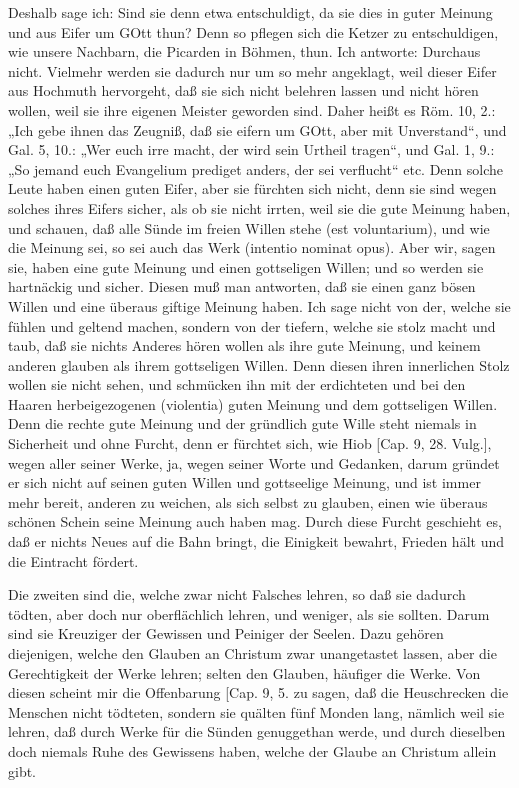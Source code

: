 Deshalb sage ich: Sind sie denn etwa entschuldigt, da sie dies in guter Meinung und aus Eifer um GOtt thun? Denn so pflegen sich die Ketzer zu entschuldigen, wie unsere Nachbarn, die Picarden in Böhmen, thun. Ich antworte: Durchaus nicht. Vielmehr werden sie dadurch nur um so mehr angeklagt, weil dieser Eifer aus Hochmuth hervorgeht, daß sie sich nicht belehren lassen und nicht hören wollen, weil sie ihre eigenen Meister geworden sind. Daher heißt es Röm. 10, 2.: „Ich gebe ihnen das Zeugniß, daß sie eifern um GOtt, aber mit Unverstand“, und Gal. 5, 10.: „Wer euch irre macht, der wird sein Urtheil tragen“, und Gal. 1, 9.: „So jemand euch Evangelium prediget anders, der sei verflucht“ etc. Denn solche Leute haben einen guten Eifer, aber sie fürchten sich nicht, denn sie sind wegen solches ihres Eifers sicher, als ob sie nicht irrten, weil sie die gute Meinung haben, und schauen, daß alle Sünde im freien Willen stehe (est voluntarium), und wie die Meinung sei, so sei auch das Werk (intentio nominat opus). Aber wir, sagen sie, haben eine gute Meinung und einen gottseligen Willen; und so werden sie hartnäckig und sicher. Diesen muß man antworten, daß sie einen ganz bösen Willen und eine überaus giftige Meinung haben. Ich sage nicht von der, welche sie fühlen und geltend machen, sondern von der tiefern, welche sie stolz macht und taub, daß sie nichts Anderes hören wollen als ihre gute Meinung, und keinem anderen glauben als ihrem gottseligen Willen. Denn diesen ihren innerlichen Stolz wollen sie nicht sehen, und schmücken ihn mit der erdichteten und bei den Haaren herbeigezogenen (violentia) guten Meinung und dem gottseligen Willen. Denn die rechte gute Meinung und der gründlich gute Wille steht niemals in Sicherheit und ohne Furcht, denn er fürchtet sich, wie Hiob [Cap. 9, 28. Vulg.], wegen aller seiner Werke, ja, wegen seiner Worte und Gedanken, darum gründet er sich nicht auf seinen guten Willen und gottseelige Meinung, und ist immer mehr bereit, anderen zu weichen, als sich selbst zu glauben, einen wie überaus schönen Schein seine Meinung auch haben mag. Durch diese Furcht geschieht es, daß er nichts Neues auf die Bahn bringt, die Einigkeit bewahrt, Frieden hält und die Eintracht fördert.

Die zweiten sind die, welche zwar nicht Falsches lehren, so daß sie dadurch tödten, aber doch nur oberflächlich lehren, und weniger, als sie sollten. Darum sind sie Kreuziger der Gewissen und Peiniger der Seelen. Dazu gehören diejenigen, welche den Glauben an Christum zwar unangetastet lassen, aber die Gerechtigkeit der Werke lehren; selten den Glauben, häufiger die Werke. Von diesen scheint mir die Offenbarung [Cap. 9, 5. zu sagen, daß die Heuschrecken die Menschen nicht tödteten, sondern sie quälten fünf Monden lang, nämlich weil sie lehren, daß
durch Werke für die Sünden genuggethan werde, und durch dieselben doch niemals Ruhe des Gewissens haben, welche der Glaube an Christum allein gibt.

